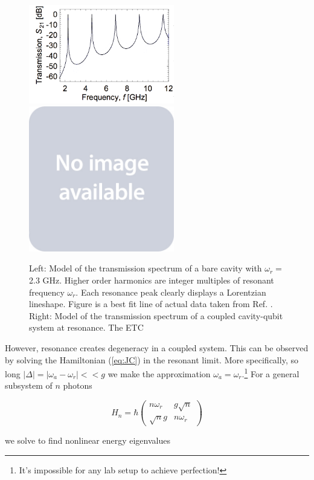 \documentclass[11 pt, oneside]{book} %
\begin{document}
\begin{figure}[h] 
   \centering
   \includegraphics[width=2.5in]{Goppl-Higher-Modes.png} \includegraphics[width=2.5in]{placeholder.jpg} 
   \caption[Models of resonator transmission spectra]{Left: Model of the transmission spectrum of a bare cavity with $\omega_r=$2.3 GHz. Higher order harmonics are integer multiples of resonant frequency $\omega_r$. Each resonance peak clearly displays a Lorentzian lineshape. Figure is a best fit line of actual data taken from Ref. \cite{Goppl}. Right: Model of the transmission spectrum of a coupled cavity-qubit system at resonance. The ETC}
   \label{fig:Transmission1}
\end{figure}

However, resonance creates degeneracy in a coupled system. This can be observed by solving the Hamiltonian (\ref{eq:JC}) in the resonant limit. More specifically, so long $|\Delta|=|\omega_a-\omega_r|<<g$ we make the approximation $\omega_a=\omega_r$.\footnote{It's impossible for any lab setup to achieve perfection!} For a general subsystem of $n$ photons

\begin{equation}
H_n = \hbar \left( \begin{array}{cc}
n\omega_r & g\sqrt{n} \\
\sqrt{n}g & n\omega_r
\end{array}\right)
\end{equation}

we solve to find nonlinear energy eigenvalues
\end{document}

